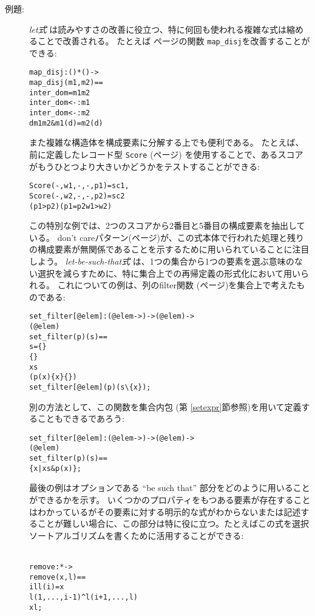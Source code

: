 \documentclass[\pformat,12pt]{jarticle}
\begin{document}
\begin{description}
\item[例題:] {\it let式} は読みやすさの改善に役立つ、特に何回も使われる複雑な式は縮めることで改善される。
たとえば \pageref{mapdisj}ページの関数 \texttt{map\_disj}を改善することができる:\begin{alltt}
  map_disj : () * () -> 
  map_disj (m1,m2) ==
     inter_dom =  m1  m2
      inter_dom <-: m1 
      inter_dom <-: m2
    d  m1  m2 & m1(d) = m2(d)
\end{alltt}
また複雑な構造体を構成要素に分解する上でも便利である。
たとえば、前に定義したレコード型 \texttt{Score} (\pageref{scoredef}ページ) を使用することで、あるスコアがもうひとつより大きいかどうかをテストすることができる:
  \begin{alltt}
     Score(-,w1,-,-,p1) = sc1,
       Score(-,w2,-,-,p2) = sc2
     (p1 > p2)  (p1 = p2  w1 > w2)
  \end{alltt}
この特別な例では、2つのスコアから2番目と5番目の構成要素を抽出している。
 don't careパターン(\pageref{patterns}ページ)が、この式本体で行われた処理と残りの構成要素が無関係であることを示するために用いられていることに注目しよう。
  {\it let-be-such-that式} は、1つの集合から1つの要素を選ぶ意味のない選択を減らすために、特に集合上での再帰定義の形式化において用いられる。
これについての例は、列のfilter関数 (\pageref{filterdef}ページ)を集合上で考えたものである:
\label{setfilterdef}
  \begin{alltt}
    set_filter[@elem] : (@elem -> ) -> ( @elem) -> 
                        ( @elem)
    set_filter(p)(s) ==
       s = \{\}
       \{\}
       x  s
           ( p(x)  \{x\}  \{\}) 
             set_filter[@elem](p)(s \verb+\+ \{x\});
   \end{alltt}
別の方法として、この関数を集合内包 (第 \ref{setexpr}節参照)を用いて定義することもできるであろう:
  \begin{alltt}
    set_filter[@elem] : (@elem -> ) -> ( @elem) -> 
                        ( @elem)
    set_filter(p)(s) ==
      \{ x | x  s & p(x)\};
  \end{alltt} 

 最後の例はオプションである ``be such that'' 部分をどのように用いることができるかを示す。
いくつかのプロパティをもつある要素が存在することはわかっているがその要素に対する明示的な式がわからないまたは記述することが難しい場合に、この部分は特に役に立つ。たとえばこの式を選択ソートアルゴリズムを書くために活用することができる:
   \begin{alltt}\label{selectionSortdef}
   remove :  *  -> 
   remove (x,l) ==
      i  l  l(i) = x
      l(1,...,i-1)\verb+^+l(i+1,..., l)
    x  l;


\end{alltt}
\end{description}
\end{document}
